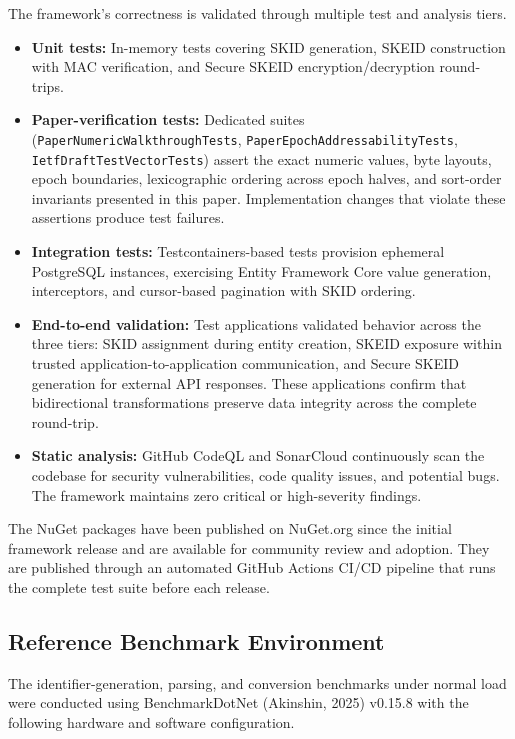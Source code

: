 \documentclass[fleqn,10pt,lineno]{wlpeerj}
\providecommand{\tightlist}{%
  \setlength{\itemsep}{0pt}\setlength{\parskip}{0pt}}
\begin{document}
The framework's correctness is validated through multiple test and
analysis tiers.

\begin{itemize}
\tightlist
\item
  \textbf{Unit tests:} In-memory tests covering SKID generation, SKEID
  construction with MAC verification, and Secure SKEID
  encryption/decryption round-trips.
\item
  \textbf{Paper-verification tests:} Dedicated suites
  (\texttt{PaperNumericWalkthroughTests},
  \texttt{PaperEpochAddressabilityTests},
  \texttt{IetfDraftTestVectorTests}) assert the exact numeric values,
  byte layouts, epoch boundaries, lexicographic ordering across epoch
  halves, and sort-order invariants presented in this paper.
  Implementation changes that violate these assertions produce test
  failures.
\item
  \textbf{Integration tests:} Testcontainers-based tests provision
  ephemeral PostgreSQL instances, exercising Entity Framework Core value
  generation, interceptors, and cursor-based pagination with SKID
  ordering.
\item
  \textbf{End-to-end validation:} Test applications validated behavior
  across the three tiers: SKID assignment during entity creation, SKEID
  exposure within trusted application-to-application communication, and
  Secure SKEID generation for external API responses. These applications
  confirm that bidirectional transformations preserve data integrity
  across the complete round-trip.
\item
  \textbf{Static analysis:} GitHub CodeQL and SonarCloud continuously
  scan the codebase for security vulnerabilities, code quality issues,
  and potential bugs. The framework maintains zero critical or
  high-severity findings.
\end{itemize}

The NuGet packages have been published on NuGet.org since the initial
framework release and are available for community review and adoption.
They are published through an automated GitHub Actions CI/CD pipeline
that runs the complete test suite before each release.

\subsection{Reference Benchmark
Environment}\label{reference-benchmark-environment}

The identifier-generation, parsing, and conversion benchmarks under
normal load were conducted using BenchmarkDotNet (Akinshin, 2025)
v0.15.8 with the following hardware and software configuration.
\end{document}
